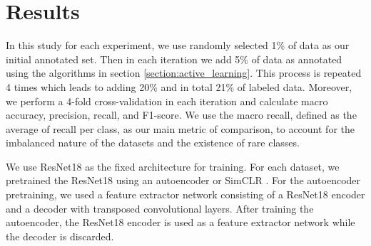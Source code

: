 
\chapter{Results}\label{chapter:results}

In this study for each experiment, we use randomly selected 1\% of data as our initial annotated set. Then in each iteration we add 5\% of data as annotated using the algorithms in section \ref{section:active_learning}. This process is repeated 4 times which leads to adding 20\% and in total 21\% of labeled data. Moreover, we perform a 4-fold cross-validation in each iteration and calculate macro accuracy, precision, recall, and F1-score. We use the macro recall, defined as the average of recall per class, as our main metric of comparison, to account for the imbalanced nature of the datasets and the existence of rare classes. 

We use ResNet18 \cite{he2016} as the fixed architecture for training. For each dataset, we pretrained the ResNet18 using an autoencoder or SimCLR \cite{chen2020}. For the autoencoder pretraining, we used a feature extractor network consisting of a ResNet18 encoder and a decoder with transposed convolutional layers. After training the autoencoder, the ResNet18 encoder is used as a feature extractor network while the decoder is discarded. 

